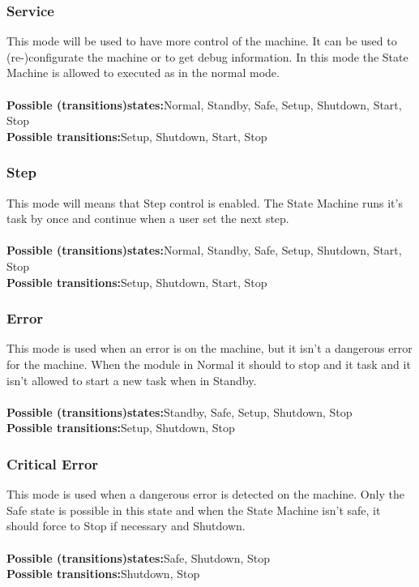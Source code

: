 \documentclass[12pt,a4paper]{report}
\begin{document}
\subsubsection{Service}This mode will be used to have more control of the machine. It can be used to (re-)configurate the machine or to get debug information. In this mode the State Machine is allowed to executed as in the normal mode.\\\\
\textbf{Possible (transitions)states:}Normal, Standby, Safe, Setup, Shutdown, Start, Stop\\
\textbf{Possible transitions:}Setup, Shutdown, Start, Stop

\subsubsection{Step}This mode will means that Step control is enabled. The State Machine runs it's task by once and continue when a user set the next step.\\\\
\textbf{Possible (transitions)states:}Normal, Standby, Safe, Setup, Shutdown, Start, Stop\\
\textbf{Possible transitions:}Setup, Shutdown, Start, Stop

\subsubsection{Error}This mode is used when an error is on the machine, but it isn't a dangerous error for the machine. When the module in Normal it should to stop and it task and it isn't allowed to start a new task when in Standby.\\\\
\textbf{Possible (transitions)states:}Standby, Safe, Setup, Shutdown, Stop\\
\textbf{Possible transitions:}Setup, Shutdown, Stop

\subsubsection{Critical Error}This mode is used when a dangerous error is detected on the machine. Only the Safe state is possible in this state and when the State Machine isn't safe, it should force to Stop if necessary and Shutdown.\\\\
\textbf{Possible (transitions)states:}Safe, Shutdown, Stop\\
\textbf{Possible transitions:}Shutdown, Stop
\end{document}
